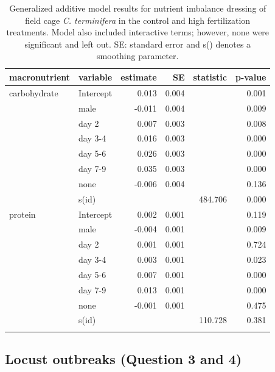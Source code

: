 \documentclass[
]{article}
\begin{document}
\begin{longtable}{llrrrr}

\toprule
macronutrient & variable & estimate & SE & statistic & p-value \\ 
\midrule\addlinespace[2.5pt]
carbohydrate & Intercept & 0.013 & 0.004 &  & 0.001 \\ 
 & male & -0.011 & 0.004 &  & 0.009 \\ 
 & day 2 & 0.007 & 0.003 &  & 0.008 \\ 
 & day 3-4 & 0.016 & 0.003 &  & 0.000 \\ 
 & day 5-6 & 0.026 & 0.003 &  & 0.000 \\ 
 & day 7-9 & 0.035 & 0.003 &  & 0.000 \\ 
 & none & -0.006 & 0.004 &  & 0.136 \\ 
 & s(id) &  &  & 484.706 & 0.000 \\ 
protein & Intercept & 0.002 & 0.001 &  & 0.119 \\ 
 & male & -0.004 & 0.001 &  & 0.009 \\ 
 & day 2 & 0.001 & 0.001 &  & 0.724 \\ 
 & day 3-4 & 0.003 & 0.001 &  & 0.023 \\ 
 & day 5-6 & 0.007 & 0.001 &  & 0.000 \\ 
 & day 7-9 & 0.013 & 0.001 &  & 0.000 \\ 
 & none & -0.001 & 0.001 &  & 0.475 \\ 
 & s(id) &  &  & 110.728 & 0.381 \\ 
\bottomrule

\caption{\label{tbl-field-cage-rebalancing}Generalized additive model
results for nutrient imbalance dressing of field cage \emph{C.
terminifera} in the control and high fertilization treatments. Model
also included interactive terms; however, none were significant and left
out. SE: standard error and s() denotes a smoothing parameter.}

\tabularnewline

\end{longtable}

\endgroup

\subsection{Locust outbreaks (Question 3 and
4)}\label{locust-outbreaks-question-3-and-4}
\end{document}
